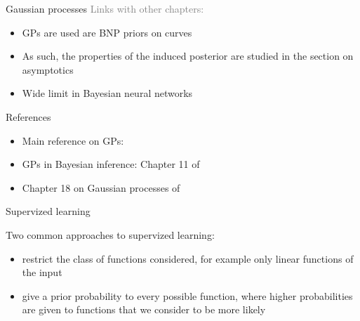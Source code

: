 \begin{frame}{Gaussian processes}
\textcolor{gray}{Links with other chapters:}
\begin{itemize}
	\item GPs are used are BNP priors on curves
	\item As such, the properties of the induced posterior are studied in the section on asymptotics
	\item Wide limit in Bayesian neural networks
\end{itemize}
\end{frame}



\begin{frame}{References}
\begin{itemize}
	\item \alert{Main reference on GPs}: 
	\item \alert{GPs in Bayesian inference}: Chapter 11 of 
	\item \alert{Chapter 18} on Gaussian processes of 
\end{itemize}
\end{frame}




\begin{frame}{Supervized learning}

Two common approaches to \alert{supervized learning}:
\begin{itemize}
	\item restrict the class of functions considered, for example only linear functions of the input
	\item give a prior probability to every possible function, where higher probabilities are given to functions that we consider to be more likely
\end{itemize}

\end{frame}



